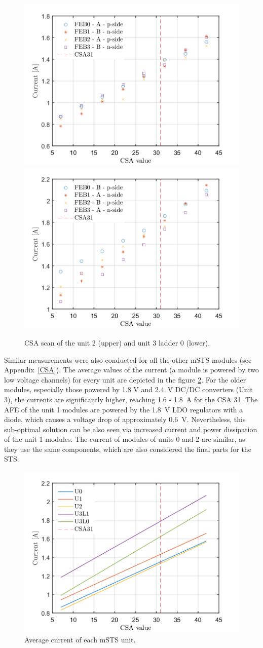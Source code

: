 \begin{figure}[h!]
\centering
\includegraphics[width=0.6\columnwidth]{Chapter6/DCS/images/U2CSABIAS.png}
\includegraphics[width=0.6\columnwidth]{Chapter6/DCS/images/U3L1CSABIAS.png}
\caption{CSA scan of the unit 2 (upper) and unit 3 ladder 0 (lower).}
\label{fig_power2}
\end{figure}
\newpage
Similar measurements were also conducted for all the other \gls{mSTS} modules (see Appendix~\ref{CSA}). The average values of the current (a module is powered by two low voltage channels) for every unit are depicted in the figure \ref{fig_avg}. For the older modules, especially those powered by 1.8 V and 2.4~V DC/DC converters (Unit 3), the currents are significantly higher, reaching 1.6 - 1.8~A for the \gls{CSA} 31. The \gls{AFE} of the unit 1 modules are powered by the 1.8~V \gls{LDO} regulators with a diode, which causes a voltage drop of approximately 0.6~V. Nevertheless, this sub-optimal solution can be also seen via increased current and power dissipation of the unit 1 modules. The current of modules of units 0 and 2 are similar, as they use the same components, which are also considered the final parts for the \gls{STS}.

\begin{figure}[h!]
\centering
\includegraphics[width=0.6\columnwidth]{Chapter6/DCS/images/units.png}
\caption{Average current of each \gls{mSTS} unit.}
\label{fig_avg}
\end{figure}

